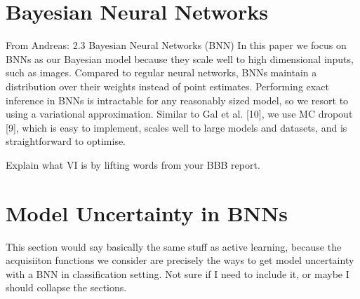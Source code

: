 \documentclass[11pt, a4paper, bibliography=totoc]{report}
\begin{document}
\section{Bayesian Neural Networks} \label{sec:bnns}
From Andreas:
2.3 Bayesian Neural Networks (BNN)
In this paper we focus on BNNs as our Bayesian model because they scale well to high dimensional
inputs, such as images. Compared to regular neural networks, BNNs maintain a distribution over
their weights instead of point estimates. Performing exact inference in BNNs is intractable for any
reasonably sized model, so we resort to using a variational approximation. Similar to Gal et al. [10],
we use MC dropout [9], which is easy to implement, scales well to large models and datasets, and is
straightforward to optimise.

Explain what VI is by lifting words from your BBB report.

\section{Model Uncertainty in BNNs}
This section would say basically the same stuff as active learning, because the acquisiiton functions we consider are precisely the ways to get model uncertainty with a BNN in classification setting.
Not sure if I need to include it, or maybe I should collapse the sections.
\end{document}
